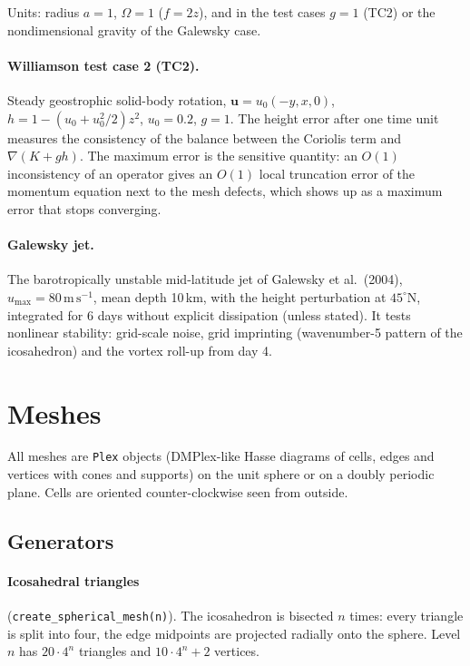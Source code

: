 \documentclass[11pt,a4paper]{article}
\newcommand{\bu}{\mathbf{u}}
\newcommand{\code}[1]{\texttt{#1}}
\begin{document}
Units: radius $a = 1$, $\Omega = 1$ ($f = 2z$), and in the test cases $g = 1$
(TC2) or the nondimensional gravity of the Galewsky case.

\paragraph{Williamson test case 2 (TC2).} Steady geostrophic solid-body
rotation, $\bu = u_0(-y,x,0)$, $h = 1 - (u_0+u_0^2/2)z^2$, $u_0 = 0.2$, $g = 1$.
The height error after one time unit measures the consistency of the balance
between the Coriolis term and $\nabla(K+gh)$.
The maximum error is the sensitive quantity: an $O(1)$ inconsistency of an operator gives
an $O(1)$ local truncation error of the momentum equation next to the mesh
defects, which shows up as a maximum error that stops converging.

\paragraph{Galewsky jet.} The barotropically unstable mid-latitude jet of
Galewsky et al.\ (2004), $u_{\max} = 80\,\mathrm{m\,s^{-1}}$, mean depth
10\,km, with the height perturbation at $45^\circ$N, integrated for 6 days
without explicit dissipation (unless stated). It tests nonlinear stability:
grid-scale noise, grid imprinting (wavenumber-5 pattern of the icosahedron)
and the vortex roll-up from day 4.

\section{Meshes}

All meshes are \code{Plex} objects (DMPlex-like Hasse diagrams of cells,
edges and vertices with cones and supports) on the unit sphere or on a doubly
periodic plane. Cells are oriented counter-clockwise seen from outside.

\subsection{Generators}

\paragraph{Icosahedral triangles} (\code{create\_spherical\_mesh(n)}). The
icosahedron is bisected $n$ times: every triangle is split into four, the
edge midpoints are projected radially onto the sphere. Level $n$ has
$20\cdot4^n$ triangles and $10\cdot4^n+2$ vertices.
\end{document}
